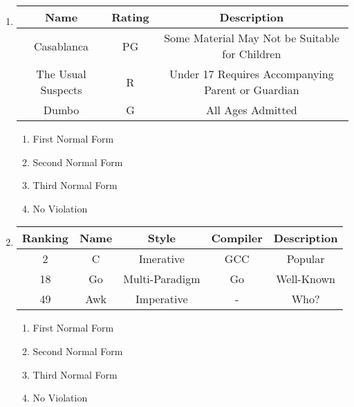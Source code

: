 \documentclass{letter}
\begin{document}
\begin{enumerate}[label=(\alph*)]
\vspace{0.5cm}

\item
\begin{tabular}{ c | c | c }
Name & Rating & Description \\
\hline
Casablanca & PG & Some Material May Not be Suitable for Children \\
The Usual Suspects & R & Under 17 Requires Accompanying Parent or Guardian \\
Dumbo & G & All Ages Admitted \\
\end{tabular}

\vspace{0.5cm}

\begin{enumerate}[label=(\roman*)]
\item First Normal Form
\item Second Normal Form
\item Third Normal Form
\item No Violation
\end{enumerate}

\vspace{0.5cm}

\item
\begin{tabular}{ c | c | c | c | c }
Ranking & Name & Style & Compiler & Description \\
\hline
2 & C & Imerative & GCC & Popular \\
18 & Go & Multi-Paradigm & Go & Well-Known \\
49 & Awk & Imperative & - & Who? \\ 
\end{tabular}

\vspace{0.5cm}

\begin{enumerate}[label=(\roman*)]
\item First Normal Form
\item Second Normal Form
\item Third Normal Form
\item No Violation
\end{enumerate}

\end{enumerate}
\end{document}
